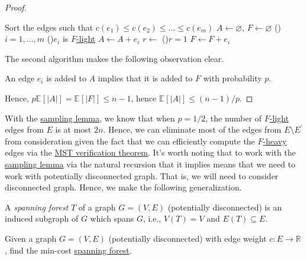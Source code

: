 \begin{proof}
\begin{algorithm}[H]
		Sort the edges such that \(c(e_1) \leq c(e_2) \leq \dots \leq c(e_m)\)\;
		\(A \gets \varnothing \), \(F \gets \varnothing \)\;
		\For(){\(i = 1, \dots , m\)}{
			\If(){\(e_i\) is \hyperref[def:light]{\(F\)-light}}{
				\(A \gets A + e_i\)\;
				\(r \gets\)
				\If(){\(r = 1\)}{
					\(F \gets F + e_i\)\;
				}
			}
		}
		\;
	\end{algorithm}

	The second algorithm makes the following observation clear.

	\begin{intuition}
		An edge \(e_i\) is added to \(A\) implies that it is added to \(F\) with probability \(p\).
	\end{intuition}

	Hence, \(p \mathbb{E}_{}[\lvert A \rvert ] = \mathbb{E}_{}[\lvert F \rvert ] \leq n - 1\), hence \(\mathbb{E}_{}[\lvert A \rvert ] \leq (n - 1) / p\).
\end{proof}

With the \hyperref[lma:sampling]{sampling lemma}, we know that when \(p = 1 / 2\), the number of \hyperref[def:light]{\(F\)-light} edges from \(E\) is at most \(2n\). Hence, we can eliminate most of the edges from \(E \setminus E^{\prime} \) from consideration given the fact that we can efficiently compute the \hyperref[def:heavy]{\(F\)-heavy} edges via the \hyperref[thm:MST-verification]{MST verification theorem}. It's worth noting that to work with the \hyperref[lma:sampling]{sampling lemma} via the natural recursion that it implies means that we need to work with potentially disconnected graph. That is, we will need to consider disconnected graph. Hence, we make the following generalization.

\begin{definition}\label{def:spanning-forest}
	A \emph{spanning forest} \(T\) of a graph \(G =(V, E)\) (potentially disconnected) is an induced subgraph of \(G\) which spans \(G\), i.e., \(V(T) = V\) and \(E(T) \subseteq E\).
\end{definition}

\begin{problem}\label{prb:MSF}
Given a graph \(G=(V, E)\) (potentially disconnected) with edge weight \(c \colon E \to \mathbb{R} \), find the min-cost \hyperref[def:spanning-forest]{spanning forest}.
\end{problem}

